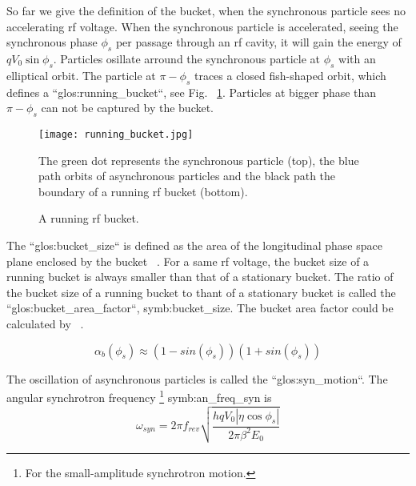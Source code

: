 So far we give the definition of the bucket, when the synchronous particle sees no accelerating rf voltage. When the synchronous particle is accelerated, seeing the synchronous phase $\phi_{\mathit{s}}$ per passage through an rf cavity, it will gain the energy of $qV_0\sin\phi_{\mathit{s}}$. %
Particles osillate arround the synchronous particle at $\phi_{\mathit{s}}$ with an elliptical orbit. The particle at $\pi-\phi_{\mathit{s}}$ traces a closed fish-shaped orbit, which defines a ``\gls{glos:running_bucket}``, see Fig. ~\ref{running_bucket}. Particles at bigger phase than $\pi-\phi_{\mathit{s}}$ can not be captured by the bucket.
\begin{figure}[!htb]
   \centering   
   \texttt{[image: running\_bucket.jpg]}
   \caption{A running rf bucket.}{The green dot represents the synchronous particle (top), the blue path orbits of asynchronous particles and the black path the boundary of a running rf bucket (bottom).}
   \label{running_bucket}
\end{figure} 

The ``\gls{glos:bucket_size}`` is defined as the area of the longitudinal phase space plane enclosed by the bucket ~\cite{lee_accelerator_2011}. For a same rf voltage, the bucket size of a running bucket is always smaller than that of a stationary bucket. The ratio of the bucket size of a running bucket to thant of a stationary bucket is called the ``\gls{glos:bucket_area_factor}``, \gls{symb:bucket_size}. The bucket area factor could be calculated by ~\cite{lee_accelerator_2011}.

\begin{equation}
\alpha_b(\phi_{s})\approx(1-sin(\phi_{s}))(1+sin(\phi_{s}))
\label{eq:buckt_area_factor}
\end{equation} 

The oscillation of asynchronous particles is called the ``\gls{glos:syn_motion}``. The angular synchrotron frequency \footnote{For the small-amplitude synchrotron motion.} \gls{symb:an_freq_syn} is ~\cite{lee_accelerator_2011}
\begin{equation}
\omega_{\mathit{syn}}=2\pi f_{\mathit{rev}}\sqrt{\frac{hqV_0|\eta\cos\phi_{s}|}{2\pi\beta^2E_0}}
\label{eq:synchfreq}
\end{equation} 

